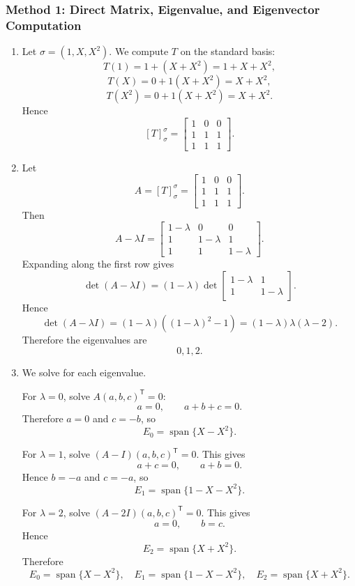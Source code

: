 \documentclass[12pt]{article}
\newcommand{\Span}{\operatorname{span}}
\newcommand{\T}{\mathsf{T}}
\begin{document}
\subsubsection{Method 1: Direct Matrix, Eigenvalue, and Eigenvector Computation}
\begin{enumerate}[label=(\alph*)]
  \item Let $\sigma=(1,X,X^2)$. We compute $T$ on the standard basis:
  \[
    T(1)=1+(X+X^2)=1+X+X^2,
  \]
  \[
    T(X)=0+1(X+X^2)=X+X^2,
  \]
  \[
    T(X^2)=0+1(X+X^2)=X+X^2.
  \]
  Hence
  \[
    \boxed{[T]_{\sigma}^{\sigma}
    =
    \begin{bmatrix}
      1&0&0\\
      1&1&1\\
      1&1&1
    \end{bmatrix}.}
  \]

  \item Let
  \[
    A=[T]_{\sigma}^{\sigma}
    =
    \begin{bmatrix}
      1&0&0\\
      1&1&1\\
      1&1&1
    \end{bmatrix}.
  \]
  Then
  \[
    A-\lambda I
    =
    \begin{bmatrix}
      1-\lambda&0&0\\
      1&1-\lambda&1\\
      1&1&1-\lambda
    \end{bmatrix}.
  \]
  Expanding along the first row gives
  \[
    \det(A-\lambda I)
    =(1-\lambda)
    \det\begin{bmatrix}
      1-\lambda&1\\
      1&1-\lambda
    \end{bmatrix}.
  \]
  Hence
  \[
    \det(A-\lambda I)
    =(1-\lambda)((1-\lambda)^2-1)
    =(1-\lambda)\lambda(\lambda-2).
  \]
  Therefore the eigenvalues are
  \[
    \boxed{0,1,2.}
  \]

  \item We solve for each eigenvalue.

  For $\lambda=0$, solve $A(a,b,c)^\T=0$:
  \[
    a=0,
    \qquad
    a+b+c=0.
  \]
  Therefore $a=0$ and $c=-b$, so
  \[
    E_0=\Span\{X-X^2\}.
  \]

  For $\lambda=1$, solve $(A-I)(a,b,c)^\T=0$. This gives
  \[
    a+c=0,
    \qquad
    a+b=0.
  \]
  Hence $b=-a$ and $c=-a$, so
  \[
    E_1=\Span\{1-X-X^2\}.
  \]

  For $\lambda=2$, solve $(A-2I)(a,b,c)^\T=0$. This gives
  \[
    a=0,
    \qquad
    b=c.
  \]
  Hence
  \[
    E_2=\Span\{X+X^2\}.
  \]
  Therefore
  \[
    \boxed{
    E_0=\Span\{X-X^2\},\quad
    E_1=\Span\{1-X-X^2\},\quad
    E_2=\Span\{X+X^2\}.}
  \]


\end{enumerate}
\end{document}
